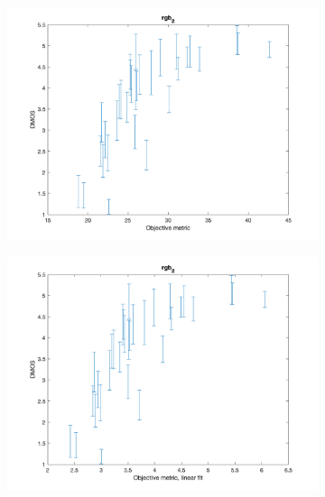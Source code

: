 \documentclass{article}
\begin{document}
\begin{figure}
    \centering
   \begin{subfigure}[b]{0.65\textwidth}
   \includegraphics[width=\textwidth]{Figures/task3/rgb2.png}
   \end{subfigure}
   \begin{subfigure}[b]{0.65\textwidth}
   \includegraphics[width=\textwidth]{Figures/task3/rgb2_linear.png}
   \end{subfigure}
   \begin{subfigure}[b]{0.65\textwidth}

\end{subfigure}
\end{figure}
\end{document}
